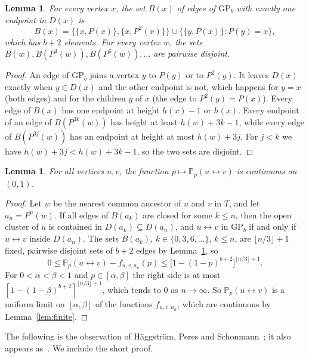 \documentclass[11pt]{amsart}
\newtheorem{lemma}[theorem]{Lemma}
\theoremstyle{remark}
\newcommand{\PP}{\mathbb{P}}
\newcommand{\GP}{\mathrm{GP}_b}
\begin{document}
\begin{lemma}\label{lem:boundary}
For every vertex $x$, the set $B(x)$ of edges of $\GP$ with exactly one endpoint in $D(x)$ is
\[
B(x)=\bigl\{\{x,P(x)\},\{x,P^2(x)\}\bigr\}\cup\bigl\{\{y,P(x)\}: P(y)=x\bigr\},
\]
which has $b+2$ elements. For every vertex $w$, the sets $B(w),B(P^3(w)),B(P^6(w)),\dots$ are pairwise disjoint.
\end{lemma}

\begin{proof}
An edge of $\GP$ joins a vertex $y$ to $P(y)$ or to $P^2(y)$. It leaves $D(x)$ exactly when $y\in D(x)$ and the other
endpoint is not, which happens for $y=x$ (both edges) and for the children $y$ of $x$ (the edge to $P^2(y)=P(x)$). Every
edge of $B(x)$ has one endpoint at height $h(x)-1$ or $h(x)$. Every endpoint of an edge of $B(P^{3k}(w))$ has height at
least $h(w)+3k-1$, while every edge of $B(P^{3j}(w))$ has an endpoint at height at most $h(w)+3j$. For $j<k$ we have
$h(w)+3j<h(w)+3k-1$, so the two sets are disjoint.
\end{proof}

\begin{lemma}\label{lem:twopoint}
For all vertices $u,v$, the function $p\mapsto\PP_p(u\leftrightarrow v)$ is continuous on $(0,1)$.
\end{lemma}

\begin{proof}
Let $w$ be the nearest common ancestor of $u$ and $v$ in $T$, and let $a_n=P^n(w)$. If all edges of $B(a_k)$ are closed
for some $k\le n$, then the open cluster of $u$ is contained in $D(a_k)\subseteq D(a_n)$, and $u\leftrightarrow v$ in
$\GP$ if and only if $u\leftrightarrow v$ inside $D(a_n)$. The sets $B(a_k)$, $k\in\{0,3,6,\dots\}$, $k\le n$, are
$\lfloor n/3\rfloor+1$ fixed, pairwise disjoint sets of $b+2$ edges by Lemma~\ref{lem:boundary}, so
\begin{equation}\label{eq:tail}
0\le\PP_p(u\leftrightarrow v)-f_{u,v,a_n}(p)\le\bigl[1-(1-p)^{b+2}\bigr]^{\lfloor n/3\rfloor+1}.
\end{equation}
For $0<\alpha<\beta<1$ and $p\in[\alpha,\beta]$ the right side is at most $[1-(1-\beta)^{b+2}]^{\lfloor n/3\rfloor+1}$,
which tends to $0$ as $n\to\infty$. So $\PP_p(u\leftrightarrow v)$ is a uniform limit on $[\alpha,\beta]$ of the
functions $f_{u,v,a_n}$, which are continuous by Lemma~\ref{lem:finite}.
\end{proof}

The following is the observation of Häggström, Peres and Schonmann~\cite[p.~87]{HPS99}; it also appears as~\cite[Lemma~3.5]{BCRTT}. We include the
short proof.
\end{document}
